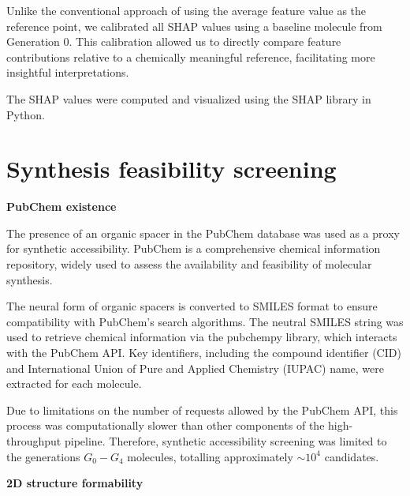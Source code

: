 Unlike the conventional approach of using the average feature value as the reference point, we calibrated all SHAP values using a baseline molecule from Generation 0. This calibration allowed us to directly compare feature contributions relative to a chemically meaningful reference, facilitating more insightful interpretations. 

The SHAP values were computed and visualized using the SHAP library in Python.

\section{Synthesis feasibility screening}\label{section:section3-5}


\textbf{PubChem existence}

The presence of an organic spacer in the PubChem database was used as a proxy for synthetic accessibility. PubChem is a comprehensive chemical information repository, widely used to assess the availability and feasibility of molecular synthesis.

The neural form of organic spacers is converted to SMILES format to ensure compatibility with PubChem’s search algorithms. The neutral SMILES string was used to retrieve chemical information via the pubchempy library, which interacts with the PubChem API. Key identifiers, including the compound identifier (CID) and International Union of Pure and Applied Chemistry (IUPAC) name, were extracted for each molecule.

Due to limitations on the number of requests allowed by the PubChem API, this process was computationally slower than other components of the high-throughput pipeline. Therefore, synthetic accessibility screening was limited to the generations $G_0-G_4$ molecules, totalling approximately $\sim10^4$ candidates.

\textbf{2D structure formability}

